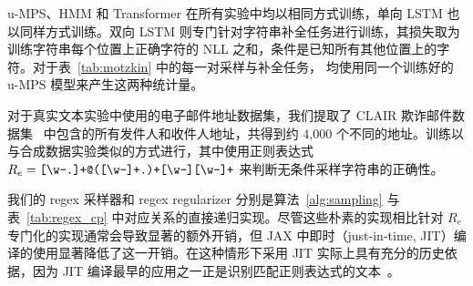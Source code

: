 u-MPS、HMM 和 Transformer 在所有实验中均以相同方式训练，单向 LSTM 也以同样方式训练。双向 LSTM 则专门针对字符串补全任务进行训练，其损失取为训练字符串每个位置上正确字符的 NLL 之和，条件是已知所有其他位置上的字符。对于表~\ref{tab:motzkin} 中的每一对采样与补全任务，
均使用同一个训练好的 u-MPS 模型来产生这两种统计量。

对于真实文本实验中使用的电子邮件地址数据集，我们提取了 CLAIR 欺诈邮件数据集~\citep{radev2008} 中包含的所有发件人和收件人地址，共得到约 4,000 个不同的地址。训练以与合成数据实验类似的方式进行，其中使用正则表达式 $R_{e} = \verb![\w-.]+@([\w-]+.)+[\w-][\w-]+!$ 来判断无条件采样字符串的正确性。

我们的 regex 采样器和 regex regularizer 分别是算法~\ref{alg:sampling} 与表~\ref{tab:regex_cp} 中对应关系的直接递归实现。尽管这些朴素的实现相比针对 $R_e$ 专门化的实现通常会导致显著的额外开销，但 JAX 中即时（just-in-time, JIT）编译的使用显著降低了这一开销。在这种情形下采用 JIT 实际上具有充分的历史依据，因为 JIT 编译最早的应用之一正是识别匹配正则表达式的文本~\citep{thompson1968}。

% 
% 



